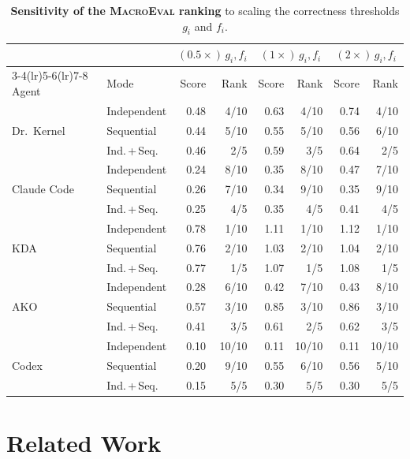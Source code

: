 \begin{table}[t]
  \centering
  \caption{\textbf{Sensitivity of the \textsc{MacroEval} ranking} to scaling the correctness thresholds $g_i$ and $f_i$.}
  \label{fastkernels:tab:e2e-sensitivity}
  \small
\begin{tabular}{@{}ll rr rr rr@{}}
\toprule
 & & \multicolumn{2}{c}{$(0.5{\times})\,g_i, f_i$} & \multicolumn{2}{c}{$(1{\times})\,g_i, f_i$} & \multicolumn{2}{c}{$(2{\times})\,g_i, f_i$} \\
\cmidrule(lr){3-4}\cmidrule(lr){5-6}\cmidrule(lr){7-8}
Agent & Mode & Score & Rank & Score & Rank & Score & Rank \\
\midrule
\multirow{3}{*}{Dr.~Kernel} & Independent & 0.48 & 4/10 & 0.63 & 4/10 & 0.74 & 4/10 \\
 & Sequential & 0.44 & 5/10 & 0.55 & 5/10 & 0.56 & 6/10 \\
 & Ind.\,+\,Seq. & 0.46 & 2/5 & 0.59 & 3/5 & 0.64 & 2/5 \\
\midrule
\multirow{3}{*}{Claude Code} & Independent & 0.24 & 8/10 & 0.35 & 8/10 & 0.47 & 7/10 \\
 & Sequential & 0.26 & 7/10 & 0.34 & 9/10 & 0.35 & 9/10 \\
 & Ind.\,+\,Seq. & 0.25 & 4/5 & 0.35 & 4/5 & 0.41 & 4/5 \\
\midrule
\multirow{3}{*}{KDA} & Independent & 0.78 & 1/10 & 1.11 & 1/10 & 1.12 & 1/10 \\
 & Sequential & 0.76 & 2/10 & 1.03 & 2/10 & 1.04 & 2/10 \\
 & Ind.\,+\,Seq. & 0.77 & 1/5 & 1.07 & 1/5 & 1.08 & 1/5 \\
\midrule
\multirow{3}{*}{AKO} & Independent & 0.28 & 6/10 & 0.42 & 7/10 & 0.43 & 8/10 \\
 & Sequential & 0.57 & 3/10 & 0.85 & 3/10 & 0.86 & 3/10 \\
 & Ind.\,+\,Seq. & 0.41 & 3/5 & 0.61 & 2/5 & 0.62 & 3/5 \\
\midrule
\multirow{3}{*}{Codex} & Independent & 0.10 & 10/10 & 0.11 & 10/10 & 0.11 & 10/10 \\
 & Sequential & 0.20 & 9/10 & 0.55 & 6/10 & 0.56 & 5/10 \\
 & Ind.\,+\,Seq. & 0.15 & 5/5 & 0.30 & 5/5 & 0.30 & 5/5 \\
\bottomrule
\end{tabular}
\end{table}

\section{Related Work}
\label{fastkernels:sec:related}

